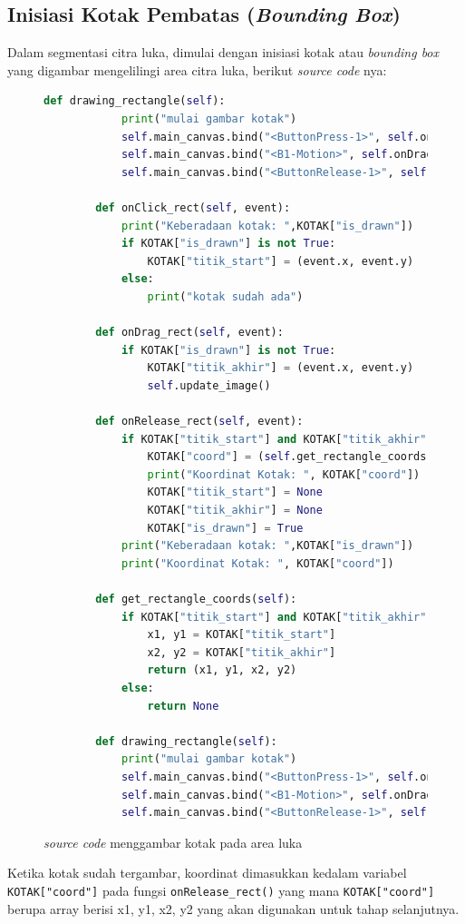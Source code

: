 \subsection{Inisiasi Kotak Pembatas (\emph{Bounding Box})}

Dalam segmentasi citra luka, dimulai dengan inisiasi kotak atau \emph{bounding box} 
yang digambar mengelilingi area citra luka, berikut \emph{source code} nya:

\begin{figure}[H]
	\begin{lstlisting}[language=Python, basicstyle=\tiny]
		def drawing_rectangle(self):
			print("mulai gambar kotak")
			self.main_canvas.bind("<ButtonPress-1>", self.onClick_rect)
			self.main_canvas.bind("<B1-Motion>", self.onDrag_rect)
			self.main_canvas.bind("<ButtonRelease-1>", self.onRelease_rect)

		def onClick_rect(self, event):
			print("Keberadaan kotak: ",KOTAK["is_drawn"])
			if KOTAK["is_drawn"] is not True:
				KOTAK["titik_start"] = (event.x, event.y)
			else:
				print("kotak sudah ada")

		def onDrag_rect(self, event):
			if KOTAK["is_drawn"] is not True:
				KOTAK["titik_akhir"] = (event.x, event.y)
				self.update_image()

		def onRelease_rect(self, event):
			if KOTAK["titik_start"] and KOTAK["titik_akhir"]:
				KOTAK["coord"] = (self.get_rectangle_coords())
				print("Koordinat Kotak: ", KOTAK["coord"])
				KOTAK["titik_start"] = None
				KOTAK["titik_akhir"] = None
				KOTAK["is_drawn"] = True
			print("Keberadaan kotak: ",KOTAK["is_drawn"])
			print("Koordinat Kotak: ", KOTAK["coord"])

		def get_rectangle_coords(self):
			if KOTAK["titik_start"] and KOTAK["titik_akhir"]:
				x1, y1 = KOTAK["titik_start"]
				x2, y2 = KOTAK["titik_akhir"]
				return (x1, y1, x2, y2)
			else:
				return None

		def drawing_rectangle(self):
			print("mulai gambar kotak")
			self.main_canvas.bind("<ButtonPress-1>", self.onClick_rect)
			self.main_canvas.bind("<B1-Motion>", self.onDrag_rect)
			self.main_canvas.bind("<ButtonRelease-1>", self.onRelease_rect)

	\end{lstlisting}
	\caption{\emph{source code} menggambar kotak pada area luka}
	\label{code:inisiasi_rectangle}
\end{figure}

Ketika kotak sudah tergambar, koordinat dimasukkan kedalam variabel \texttt{KOTAK["coord"]}
pada fungsi \texttt{onRelease\_rect()} yang mana \texttt{KOTAK["coord"]} berupa array 
berisi x1, y1, x2, y2 yang akan digunakan untuk tahap selanjutnya.

